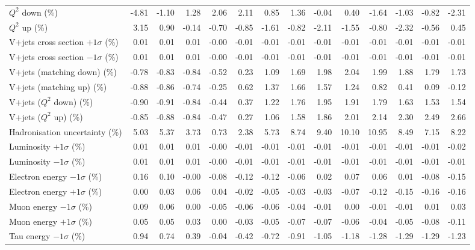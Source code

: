 \begin{table}[htbp]
{\begin{tabular}{lrrrrrrrrrrrrr}
$Q^{2}$ down (\%) & -4.81 & -1.10 & 1.28 & 2.06 & 2.11 & 0.85 & 1.36 & -0.04 & 0.40 & -1.64 & -1.03 & -0.82 & -2.31 \\ 
$Q^{2}$ up (\%) & 3.15 & 0.90 & -0.14 & -0.70 & -0.85 & -1.61 & -0.82 & -2.11 & -1.55 & -0.80 & -2.32 & -0.56 & 0.45 \\ 
V+jets cross section \ensuremath{+1\sigma} (\%) & 0.01 & 0.01 & 0.01 & -0.00 & -0.01 & -0.01 & -0.01 & -0.01 & -0.01 & -0.01 & -0.01 & -0.01 & -0.01 \\ 
V+jets cross section \ensuremath{-1\sigma} (\%) & 0.01 & 0.01 & 0.01 & -0.00 & -0.01 & -0.01 & -0.01 & -0.01 & -0.01 & -0.01 & -0.01 & -0.01 & -0.01 \\ 
V+jets (matching down) (\%) & -0.78 & -0.83 & -0.84 & -0.52 & 0.23 & 1.09 & 1.69 & 1.98 & 2.04 & 1.99 & 1.88 & 1.79 & 1.73 \\ 
V+jets (matching up) (\%) & -0.88 & -0.86 & -0.74 & -0.25 & 0.62 & 1.37 & 1.66 & 1.57 & 1.24 & 0.82 & 0.41 & 0.09 & -0.12 \\ 
V+jets ($Q^{2}$ down) (\%) & -0.90 & -0.91 & -0.84 & -0.44 & 0.37 & 1.22 & 1.76 & 1.95 & 1.91 & 1.79 & 1.63 & 1.53 & 1.54 \\ 
V+jets ($Q^{2}$ up) (\%) & -0.85 & -0.88 & -0.84 & -0.47 & 0.27 & 1.06 & 1.58 & 1.86 & 2.01 & 2.14 & 2.30 & 2.49 & 2.66 \\ 
Hadronisation uncertainty (\%) & 5.03 & 5.37 & 3.73 & 0.73 & 2.38 & 5.73 & 8.74 & 9.40 & 10.10 & 10.95 & 8.49 & 7.15 & 8.22 \\ 
Luminosity $+1\sigma$ (\%) & 0.01 & 0.01 & 0.01 & -0.00 & -0.01 & -0.01 & -0.01 & -0.01 & -0.01 & -0.01 & -0.01 & -0.01 & -0.02 \\ 
Luminosity $-1\sigma$ (\%) & 0.01 & 0.01 & 0.01 & -0.00 & -0.01 & -0.01 & -0.01 & -0.01 & -0.01 & -0.01 & -0.01 & -0.01 & -0.01 \\ 
Electron energy $-1\sigma$ (\%) & 0.16 & 0.10 & -0.00 & -0.08 & -0.12 & -0.12 & -0.06 & 0.02 & 0.07 & 0.06 & 0.01 & -0.08 & -0.15 \\ 
Electron energy $+1\sigma$ (\%) & 0.00 & 0.03 & 0.06 & 0.04 & -0.02 & -0.05 & -0.03 & -0.03 & -0.07 & -0.12 & -0.15 & -0.16 & -0.16 \\ 
Muon energy $-1\sigma$ (\%) & 0.09 & 0.06 & 0.00 & -0.05 & -0.06 & -0.06 & -0.04 & -0.01 & 0.00 & -0.01 & -0.01 & 0.01 & 0.03 \\ 
Muon energy $+1\sigma$ (\%) & 0.05 & 0.05 & 0.03 & 0.00 & -0.03 & -0.05 & -0.07 & -0.07 & -0.06 & -0.04 & -0.05 & -0.08 & -0.11 \\ 
Tau energy $-1\sigma$ (\%) & 0.94 & 0.74 & 0.39 & -0.04 & -0.42 & -0.72 & -0.91 & -1.05 & -1.18 & -1.28 & -1.29 & -1.29 & -1.23 \\ 

\end{tabular}}
\end{table}
